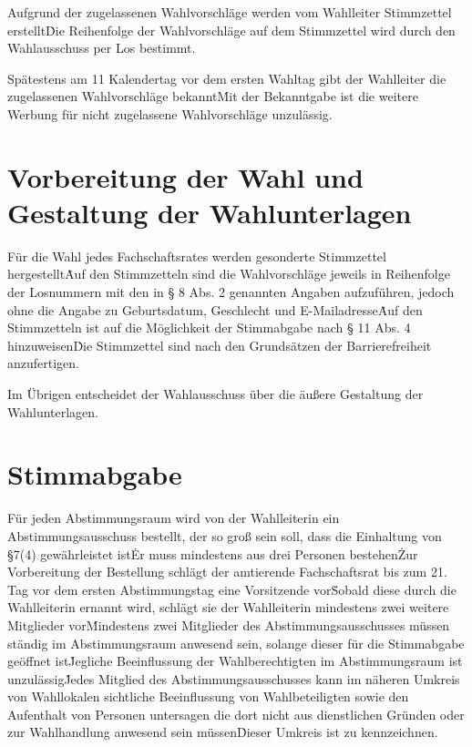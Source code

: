 \begin{multicols}{2}
\Abs \Satz Aufgrund der zugelassenen Wahlvorschläge werden vom Wahlleiter Stimmzettel erstellt\. Die Reihenfolge der Wahlvorschläge auf dem Stimmzettel wird durch den Wahlausschuss per Los bestimmt.

\Abs \Satz Spätestens am 11 Kalendertag vor dem ersten Wahltag gibt der Wahlleiter die zugelassenen Wahlvorschläge bekannt\. Mit der Bekanntgabe ist die weitere Werbung für nicht zugelassene Wahlvorschläge unzulässig.

\section{Vorbereitung der Wahl und Gestaltung der Wahlunterlagen}
\Abs \Satz Für die Wahl jedes Fachschaftsrates werden gesonderte Stimmzettel hergestellt\. Auf den Stimmzetteln sind die Wahlvorschläge jeweils in Reihenfolge der Losnummern mit den in § 8 Abs. 2 genannten Angaben aufzuführen, jedoch ohne die Angabe zu Geburtsdatum, Geschlecht und E-Mailadresse\. Auf den Stimmzetteln ist auf die Möglichkeit der Stimmabgabe nach § 11 Abs. 4 hinzuweisen\. Die Stimmzettel sind nach den Grundsätzen der Barrierefreiheit anzufertigen.

\Abs \Satz Im Übrigen entscheidet der Wahlausschuss über die äußere Gestaltung der Wahlunterlagen.

\section {Stimmabgabe}
\Abs \Satz Für jeden Abstimmungsraum wird von der Wahlleiterin ein Abstimmungsausschuss bestellt, der so groß sein soll, dass die Einhaltung von §7(4) gewährleistet ist\. Er muss mindestens aus drei Personen bestehen\. Zur Vorbereitung der Bestellung schlägt der amtierende Fachschaftsrat bis zum 21. Tag vor dem ersten Abstimmungstag eine Vorsitzende vor\. Sobald diese durch die Wahlleiterin ernannt wird, schlägt sie der Wahlleiterin mindestens zwei weitere Mitglieder vor\. Mindestens zwei Mitglieder des Abstimmungsausschusses müssen ständig im Abstimmungsraum anwesend sein, solange dieser für die Stimmabgabe geöffnet ist\. Jegliche Beeinflussung der Wahlberechtigten im Abstimmungsraum ist unzulässig\. Jedes Mitglied des Abstimmungsausschusses kann im näheren Umkreis von Wahllokalen sichtliche Beeinflussung von Wahlbeteiligten sowie den Aufenthalt von Personen untersagen die dort nicht aus dienstlichen Gründen oder zur Wahlhandlung anwesend sein müssen\. Dieser Umkreis ist zu kennzeichnen.


\end{multicols}
